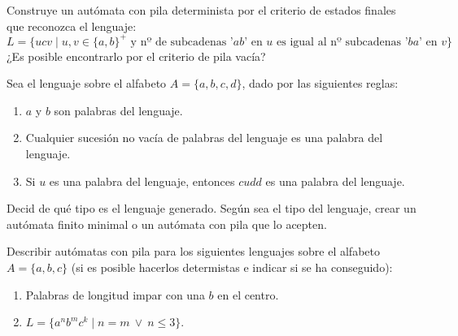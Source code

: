 \begin{ejercicio}\label{ej:1.5.21}
    Construye un autómata con pila determinista por el criterio de estados finales que reconozca el lenguaje:
    \begin{equation*}
        L = \{ucv\mid u,v\in {\{a,b\}}^{+} \text{\ y nº de subcadenas '}ab \text{' en\ } u \text{\ es igual al nº subcadenas '} ba \text{' en\ }v\}
    \end{equation*}
    ¿Es posible encontrarlo por el criterio de pila vacía?
\end{ejercicio}

\begin{ejercicio}\label{ej:1.5.22}
    Sea el lenguaje sobre el alfabeto $A = \{a,b,c,d\}$, dado por las siguientes reglas:
    \begin{enumerate}
        \item $a$ y $b$ son palabras del lenguaje.
        \item Cualquier sucesión no vacía de palabras del lenguaje es una palabra del lenguaje.
        \item Si $u$ es una palabra del lenguaje, entonces $cudd$ es una palabra del lenguaje.
    \end{enumerate}
    Decid de qué tipo es el lenguaje generado. Según sea el tipo del lenguaje, crear un autómata finito minimal o un autómata con pila que lo acepten.
\end{ejercicio}

\begin{ejercicio}\label{ej:1.5.23}
    Describir autómatas con pila para los siguientes lenguajes sobre el alfabeto $A = \{a,b,c\}$ (si es posible hacerlos determistas e indicar si se ha conseguido):
    \begin{enumerate}
        \item Palabras de longitud impar con una $b$ en el centro.
        \item $L = \{a^n b^m c^k \mid n = m\ \lor\ n \leq 3\}$.
    \end{enumerate}
\end{ejercicio}


